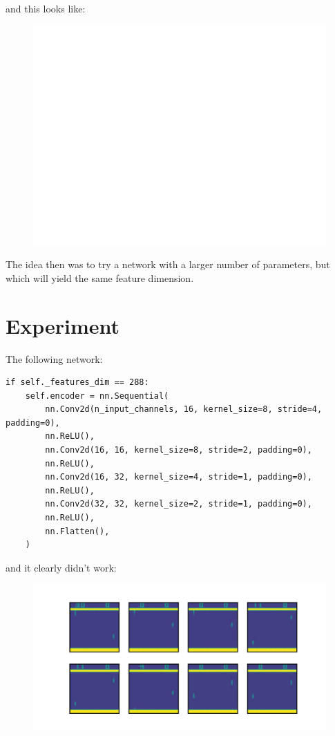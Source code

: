 \documentclass{article}
\begin{document}
and this looks like:
\begin{figure}[htpb]
		\centering
		\includegraphics[width=1.0\textwidth]{../../latent_only/ae_resulting_images_features_dim_288_small.png}
		\caption{}
\end{figure}

The idea then was to try a network with a larger number of parameters,
but which will yield the same feature dimension.

\section{Experiment}
The following network:
\begin{verbatim}
if self._features_dim == 288:
    self.encoder = nn.Sequential(
        nn.Conv2d(n_input_channels, 16, kernel_size=8, stride=4, padding=0),
        nn.ReLU(),
        nn.Conv2d(16, 16, kernel_size=8, stride=2, padding=0),
        nn.ReLU(),
        nn.Conv2d(16, 32, kernel_size=4, stride=1, padding=0),
        nn.ReLU(),
        nn.Conv2d(32, 32, kernel_size=2, stride=1, padding=0),
        nn.ReLU(),
        nn.Flatten(),
    )

\end{verbatim}

and it clearly didn't work:
\begin{figure}[htpb]
		\centering
		\includegraphics[width=1.0\textwidth]{../../latent_only/ae_resulting_images_features_dim_288_slightly_bigger.png}
		\caption{}
		\label{fig:}
\end{figure}
\end{document}
